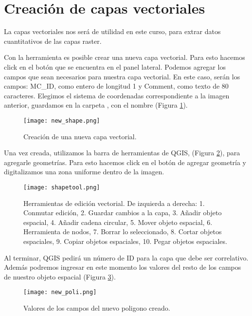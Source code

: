\section{Creaci\'on de capas vectoriales}

La capas vectoriales nos ser\'a de utilidad en este curso, para extrar datos
cuantitativos de las capas raster.

Con la herramienta  es posible crear una nueva
capa vectorial. Para esto hacemos click en el bot\'on que se
encuentra en el panel lateral. Podemos agregar los campos que sean necesarios
para nuestra capa vectorial. En este caso, ser\'an los campos: MC\_ID, como
entero de longitud 1 y Comment, como texto de 80 caracteres. Elegimos el sistema
de coordenadas correspondiente a la imagen anterior, guardamos en la carpeta
, con el nombre  (Figura \ref{fig:newshape}).

\begin{figure}[h!]
\begin{center}
    \texttt{[image: new\_shape.png]}
\end{center}
\caption{Creaci\'on de una nueva capa vectorial.}
\label{fig:newshape}
\end{figure}


Una vez creada, utilizamos la barra de herramientas de QGIS, (Figura \ref{fig:shapetool}),
para agregarle geometr\'ias. Para esto hacemos click en el bot\'on
de agregar geometr\'ia y digitalizamos una zona uniforme dentro de la imagen.
\begin{figure}[h!]
\begin{center}
    \texttt{[image: shapetool.png]}
\end{center}
\caption{Herramientas de edición vectorial. De izquierda a derecha: 1. Conmutar
    edici\'on, 2. Guardar cambios a la capa, 3. Añadir objeto espacial, 4. Añadir
    cadena circular, 5. Mover objeto espacial, 6. Herramienta de nodos, 7.
    Borrar lo seleccionado, 8. Cortar objetos espaciales, 9. Copiar objetos
    espaciales, 10. Pegar objetos espaciales.}
\label{fig:shapetool}
\end{figure}

Al terminar, QGIS pedir\'a un n\'umero de ID para la capa que debe ser
correlativo. Además podremos ingresar en este momento los valores del resto de
los campos de nuestro objeto espacial (Figura \ref{fig:newpoli}).

\begin{figure}[h!]
\begin{center}
\texttt{[image: new\_poli.png]}
\end{center}
\caption{Valores de los campos del nuevo poligono creado.}
\label{fig:newpoli}
\end{figure}

